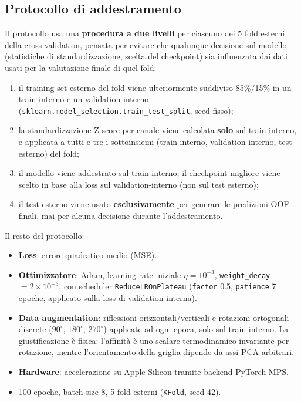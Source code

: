 \documentclass[11pt,a4paper]{article}
\begin{document}
\subsection{Protocollo di addestramento}
\label{sec:task4-protocol}
Il protocollo usa una \textbf{procedura a due livelli} per ciascuno dei 5 fold esterni della cross-validation, pensata per evitare che qualunque decisione sul modello (statistiche di standardizzazione, scelta del checkpoint) sia influenzata dai dati usati per la valutazione finale di quel fold:
\begin{enumerate}
    \item il training set esterno del fold viene ulteriormente suddiviso 85\%/15\% in un train-interno e un validation-interno (\texttt{sklearn.model\_selection.train\_test\_split}, seed fisso);
    \item la standardizzazione Z-score per canale viene calcolata \textbf{solo} sul train-interno, e applicata a tutti e tre i sottoinsiemi (train-interno, validation-interno, test esterno) del fold;
    \item il modello viene addestrato sul train-interno; il checkpoint migliore viene scelto in base alla loss sul validation-interno (non sul test esterno);
    \item il test esterno viene usato \textbf{esclusivamente} per generare le predizioni OOF finali, mai per alcuna decisione durante l'addestramento.
\end{enumerate}
Il resto del protocollo:
\begin{itemize}
    \item \textbf{Loss}: errore quadratico medio (MSE).
    \item \textbf{Ottimizzatore}: Adam, learning rate iniziale $\eta = 10^{-3}$, \texttt{weight\_decay} $=2\times10^{-3}$, con scheduler \texttt{ReduceLROnPlateau} (\texttt{factor} 0.5, \texttt{patience} 7 epoche, applicato sulla loss di validation-interna).
    \item \textbf{Data augmentation}: riflessioni orizzontali/verticali e rotazioni ortogonali discrete ($90^\circ$, $180^\circ$, $270^\circ$) applicate ad ogni epoca, solo sul train-interno. La giustificazione è fisica: l'affinità è uno scalare termodinamico invariante per rotazione, mentre l'orientamento della griglia dipende da assi PCA arbitrari.
    \item \textbf{Hardware}: accelerazione su Apple Silicon tramite backend PyTorch MPS.
    \item 100 epoche, batch size 8, 5 fold esterni (\texttt{KFold}, seed 42).
\end{itemize}
 
\end{document}
